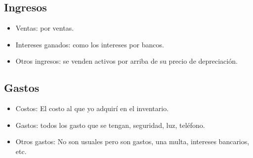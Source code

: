 \subsection{Ingresos}
\begin{itemize}
    \item Ventas: por ventas.
    \item Intereses ganados: como los intereses por bancos.
    \item Otros ingresos: se venden activos por arriba de su precio de depreciación.
\end{itemize}

\subsection{Gastos}
\begin{itemize}
    \item Costos: El costo al que yo adquirí en el inventario. 
    \item Gastos: todos los gasto que se tengan, seguridad, luz, teléfono.
    \item Otros gastos: No son usuales pero son gastos, una multa, intereses bancarios, etc. 
\end{itemize}

